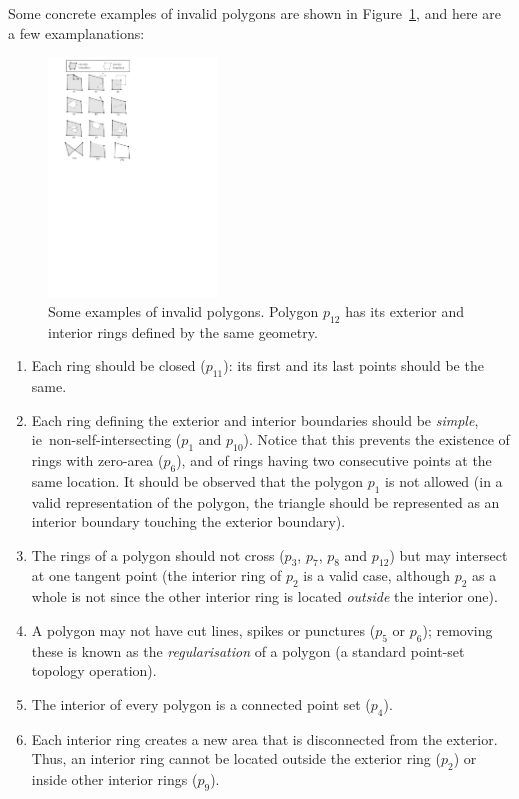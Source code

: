 \documentclass[a4paper,parskip=half,11pt]{scrartcl}
\newcommand{\ie}{ie}
\begin{document}
Some concrete examples of invalid polygons are shown in Figure~\ref{fig:p}, and here are a few examplanations:
\begin{figure}
  \centering
  \includegraphics[width=0.4\textwidth]{figs/unitpolygons.pdf}
  \caption{Some examples of invalid polygons. Polygon $p_{12}$ has its exterior and interior rings defined by the same geometry.}\label{fig:p}
\end{figure}
\begin{enumerate}
  \item Each ring should be closed ($p_{11}$): its first and its last points should be the same.
  \item Each ring defining the exterior and interior boundaries should be \emph{simple}, \ie\ non-self-intersecting ($p_{1}$ and $p_{10}$).  
  Notice that this prevents the existence of rings with zero-area ($p_{6}$), and of rings having two consecutive points at the same location. 
  It should be observed that the polygon $p_{1}$ is not allowed (in a valid representation of the polygon, the triangle should be represented as an interior boundary touching the exterior boundary).
  \item The rings of a polygon should not cross ($p_{3}$, $p_{7}$, $p_{8}$ and $p_{12}$) but may intersect at one tangent point (the interior ring of $p_{2}$ is a valid case, although $p_2$ as a whole is not since the other interior ring is located \emph{outside} the interior one).
  \item A polygon may not have cut lines, spikes or punctures ($p_{5}$ or $p_{6}$); removing these is known as the \emph{regularisation} of a polygon (a standard point-set topology operation).
  \item The interior of every polygon is a connected point set ($p_{4}$).
  \item Each interior ring creates a new area that is disconnected from the exterior. 
  Thus, an interior ring cannot be located outside the exterior ring ($p_{2}$) or inside other interior rings ($p_{9}$).
\end{enumerate}
\end{document}
